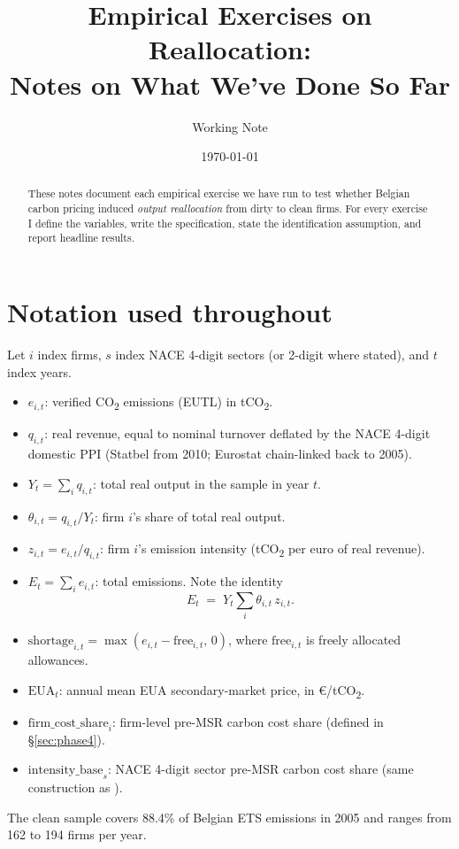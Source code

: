 \documentclass[11pt]{article}
\title{Empirical Exercises on Reallocation:\\
\large Notes on What We've Done So Far}
\author{Working Note}
\date{\today}
\begin{document}
\maketitle

\begin{abstract}
These notes document each empirical exercise we have run to test whether
Belgian carbon pricing induced \emph{output reallocation} from dirty to clean
firms. For every exercise I define the variables, write the specification,
state the identification assumption, and report headline results.
\end{abstract}

\tableofcontents

\section{Notation used throughout}

Let $i$ index firms, $s$ index NACE 4-digit sectors (or 2-digit where stated), and $t$ index years.
\begin{itemize}
  \item $e_{i,t}$: verified CO\textsubscript{2} emissions (EUTL) in tCO\textsubscript{2}.
  \item $q_{i,t}$: real revenue, equal to nominal turnover deflated by the NACE 4-digit domestic PPI (Statbel from 2010; Eurostat chain-linked back to 2005).
  \item $Y_t = \sum_i q_{i,t}$: total real output in the sample in year $t$.
  \item $\theta_{i,t} = q_{i,t} / Y_t$: firm $i$'s share of total real output.
  \item $z_{i,t} = e_{i,t} / q_{i,t}$: firm $i$'s emission intensity (tCO\textsubscript{2} per euro of real revenue).
  \item $E_t = \sum_i e_{i,t}$: total emissions. Note the identity
  \begin{equation}
      E_t \;=\; Y_t \sum_i \theta_{i,t}\, z_{i,t}. \label{eq:identity}
  \end{equation}
  \item $\mathrm{shortage}_{i,t} = \max(e_{i,t} - \mathrm{free}_{i,t},\, 0)$, where $\mathrm{free}_{i,t}$ is freely allocated allowances.
  \item $\mathrm{EUA}_t$: annual mean EUA secondary-market price, in \euro/tCO\textsubscript{2}.
  \item $\mathrm{firm\_cost\_share}_i$: firm-level pre-MSR carbon cost share (defined in \S\ref{sec:phase4}).
  \item $\mathrm{intensity\_base}_s$: NACE 4-digit sector pre-MSR carbon cost share (same construction as \cite{phase3}).
\end{itemize}
The clean sample covers 88.4\% of Belgian ETS emissions in 2005 and ranges from 162 to 194 firms per year.
\end{document}
